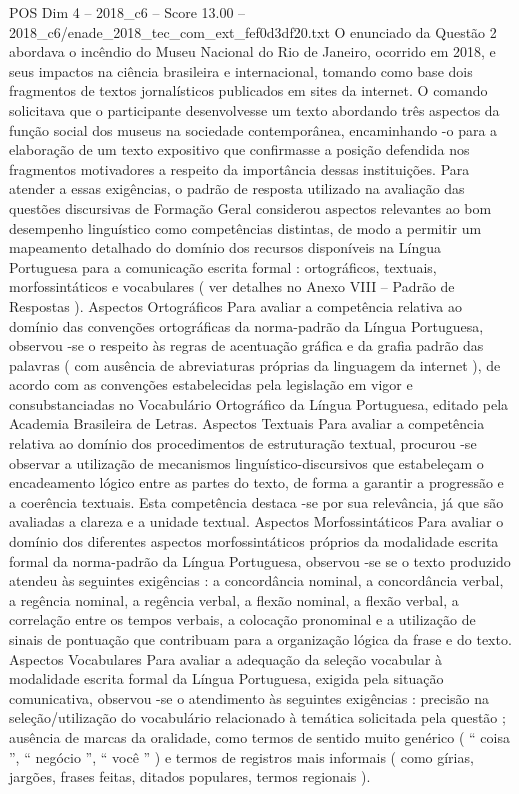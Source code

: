 \begin{textsample}{POS Dim 4 – 2018\_c6 – Score 13.00 – 2018\_c6/enade\_2018\_tec\_com\_ext\_fef0d3df20.txt}
O enunciado da Questão 2 abordava o incêndio do Museu Nacional do Rio de Janeiro, ocorrido em 2018, e seus impactos na ciência brasileira e internacional, tomando como base dois fragmentos de textos jornalísticos publicados em sites da internet.
O comando solicitava que o participante desenvolvesse um texto abordando três aspectos da função social dos museus na sociedade contemporânea, encaminhando -o para a elaboração de um texto expositivo que confirmasse a posição defendida nos fragmentos motivadores a respeito da importância dessas instituições.
Para atender a essas exigências, o padrão de resposta utilizado na avaliação das questões discursivas de Formação Geral considerou aspectos relevantes ao bom desempenho linguístico como competências distintas, de modo a permitir um mapeamento detalhado do domínio dos recursos disponíveis na Língua Portuguesa para a comunicação escrita formal : ortográficos, textuais, morfossintáticos e vocabulares ( ver detalhes no Anexo VIII – Padrão de Respostas ).
Aspectos Ortográficos Para avaliar a competência relativa ao domínio das convenções ortográficas da norma-padrão da Língua Portuguesa, observou -se o respeito às regras de acentuação gráfica e da grafia padrão das palavras ( com ausência de abreviaturas próprias da linguagem da internet ), de acordo com as convenções estabelecidas pela legislação em vigor e consubstanciadas no Vocabulário Ortográfico da Língua Portuguesa, editado pela Academia Brasileira de Letras.
Aspectos Textuais Para avaliar a competência relativa ao domínio dos procedimentos de estruturação textual, procurou -se observar a utilização de mecanismos linguístico-discursivos que estabeleçam o encadeamento lógico entre as partes do texto, de forma a garantir a progressão e a coerência textuais.
Esta competência destaca -se por sua relevância, já que são avaliadas a clareza e a unidade textual.
Aspectos Morfossintáticos Para avaliar o domínio dos diferentes aspectos morfossintáticos próprios da modalidade escrita formal da norma-padrão da Língua Portuguesa, observou -se se o texto produzido atendeu às seguintes exigências : a concordância nominal, a concordância verbal, a regência nominal, a regência verbal, a flexão nominal, a flexão verbal, a correlação entre os tempos verbais, a colocação pronominal e a utilização de sinais de pontuação que contribuam para a organização lógica da frase e do texto.
Aspectos Vocabulares Para avaliar a adequação da seleção vocabular à modalidade escrita formal da Língua Portuguesa, exigida pela situação comunicativa, observou -se o atendimento às seguintes exigências : precisão na seleção/utilização do vocabulário relacionado à temática solicitada pela questão ; ausência de marcas da oralidade, como termos de sentido muito genérico ( “ coisa ”, “ negócio ”, “ você ” ) e termos de registros mais informais ( como gírias, jargões, frases feitas, ditados populares, termos regionais ).

\end{textsample}
